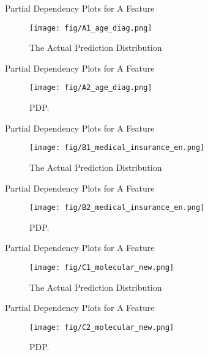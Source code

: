 \documentclass[10pt]{beamer}
\begin{document}
\begin{frame}{Partial Dependency Plots for A Feature}
  \begin{figure}[htbp]
    \centering
    \texttt{[image: fig/A1\_age\_diag.png]}
    \caption{The Actual Prediction Distribution}
  \end{figure}

\end{frame}

\begin{frame}{Partial Dependency Plots for A Feature}
  \begin{figure}[htbp]
    \centering
    \texttt{[image: fig/A2\_age\_diag.png]}
    \caption{PDP.}
  \end{figure}

\end{frame}

\begin{frame}{Partial Dependency Plots for A Feature}
  \begin{figure}[htbp]
    \centering
    \texttt{[image: fig/B1\_medical\_insurance\_en.png]}
    \caption{The Actual Prediction Distribution}
  \end{figure}

\end{frame}

\begin{frame}{Partial Dependency Plots for A Feature}
  \begin{figure}[htbp]
    \centering
    \texttt{[image: fig/B2\_medical\_insurance\_en.png]}
    \caption{PDP.}
  \end{figure}

\end{frame}

\begin{frame}{Partial Dependency Plots for A Feature}
  \begin{figure}[htbp]
    \centering
    \texttt{[image: fig/C1\_molecular\_new.png]}
    \caption{The Actual Prediction Distribution}
  \end{figure}

\end{frame}

\begin{frame}{Partial Dependency Plots for A Feature}
  \begin{figure}[htbp]
    \centering
    \texttt{[image: fig/C2\_molecular\_new.png]}
    \caption{PDP.}
  \end{figure}

\end{frame}
\end{document}
